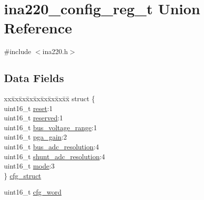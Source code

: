 \hypertarget{unionina220__config__reg__t}{\section{ina220\-\_\-config\-\_\-reg\-\_\-t Union Reference}
\label{unionina220__config__reg__t}
}


{\ttfamily \#include $<$ina220.\-h$>$}

\subsection*{Data Fields}
\begin{DoxyCompactItemize}
\item 
\begin{tabbing}
xx\=xx\=xx\=xx\=xx\=xx\=xx\=xx\=xx\=\kill
struct \{\\
\>uint16\_t \hyperlink{unionina220__config__reg__t_ad6b429e9680e9d32115b2abcc94d480d}{reset}:1\\
\>uint16\_t \hyperlink{unionina220__config__reg__t_aef59be74854fd52f940ba84cbe5e3698}{reserved}:1\\
\>uint16\_t \hyperlink{unionina220__config__reg__t_adbc6b1cc7e8f467de1a58c2f4d5bf80f}{bus\_voltage\_range}:1\\
\>uint16\_t \hyperlink{unionina220__config__reg__t_a84e00dbce45740223ede3a35928a75e4}{pga\_gain}:2\\
\>uint16\_t \hyperlink{unionina220__config__reg__t_a34b5582b6b0f9b49b58dcb8c205578be}{bus\_adc\_resolution}:4\\
\>uint16\_t \hyperlink{unionina220__config__reg__t_a0bf0abdeb0eb4b5f0897ad8c0cf99897}{shunt\_adc\_resolution}:4\\
\>uint16\_t \hyperlink{unionina220__config__reg__t_a0680ce2aeac1e0a6067ad2927e3161ce}{mode}:3\\
\} \hyperlink{unionina220__config__reg__t_aa8d92a428baf1e396aeb85fc80b42844}{cfg\_struct}\\

\end{tabbing}\item 
uint16\-\_\-t \hyperlink{unionina220__config__reg__t_a20d82853bb659aa69702d48aabc920b3}{cfg\-\_\-word}
\end{DoxyCompactItemize}


